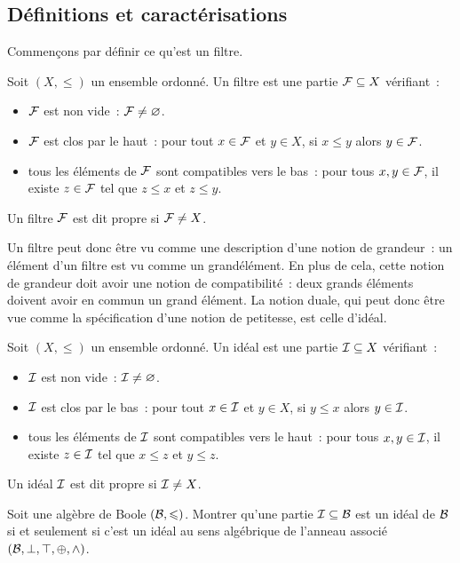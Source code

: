 \subsection{Définitions et caractérisations}

\noindent
Commençons par définir ce qu'est un filtre.

\begin{definition}[Filtre]
  Soit $(X,\leq)$ un ensemble ordonné. Un filtre est une partie
  $\mathcal{F}\subseteq X$ vérifiant~:
  \begin{itemize}
  \item $\mathcal{F}$ est non vide~: $\mathcal{F} \neq\varnothing$.
  \item $\mathcal{F}$ est clos par le haut~: pour tout $x\in \mathcal{F}$ et
    $y\in X$, si $x\leq y$ alors $y\in \mathcal{F}$.
  \item tous les éléments de $\mathcal{F}$ sont compatibles vers le bas~: pour
    tous $x,y\in\mathcal{F}$, il existe $z\in\mathcal{F}$ tel que $z\leq x$ et
    $z\leq y$.
  \end{itemize}
  Un filtre $\mathcal{F}$ est dit propre si $\mathcal{F} \neq X$.
\end{definition}

Un filtre peut donc être vu comme une description d'une notion de grandeur~:
un élément d'un filtre est vu comme un \og grand\fg élément. En plus de cela,
cette notion de grandeur doit avoir une notion de compatibilité~: deux grands
éléments doivent avoir en commun un grand élément. La notion duale, qui peut
donc être vue comme la spécification d'une notion de petitesse, est celle
d'idéal.

\begin{definition}[Idéal]
  Soit $(X,\leq)$ un ensemble ordonné. Un idéal est une partie
  $\mathcal{I} \subseteq X$ vérifiant~:
  \begin{itemize}
  \item $\mathcal{I}$ est non vide~: $\mathcal{I} \neq\varnothing$.
  \item $\mathcal{I}$ est clos par le bas~: pour tout $x\in \mathcal{I}$ et
    $y\in X$, si $y\leq x$ alors $y\in \mathcal{I}$.
  \item tous les éléments de $\mathcal{I}$ sont compatibles vers le haut~:
    pour tous $x,y\in \mathcal{I}$, il existe $z\in \mathcal{I}$ tel que
    $x\leq z$ et $y\leq z$.
  \end{itemize}
  Un idéal $\mathcal{I}$ est dit propre si $\mathcal{I} \neq X$.
\end{definition}

\begin{exercise}
  Soit une algèbre de Boole $(\mathcal{B},\leqslant)$. Montrer qu'une partie
  $\mathcal{I} \subseteq \mathcal{B}$ est un idéal de $\mathcal{B}$ si et seulement si c'est
  un idéal au sens algébrique de l'anneau associé
  $(\mathcal{B},\bot,\top,\oplus,\wedge)$.
\end{exercise}

